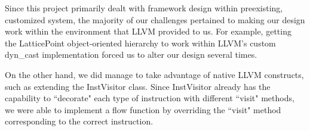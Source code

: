 \documentclass{article}
\theoremstyle{definition}
\begin{document}
Since this project primarily dealt with framework design within preexisting, customized system, the majority of our challenges pertained to making our design work within the environment that LLVM provided to us. For example, getting the LatticePoint object-oriented hierarchy to work within LLVM's custom dyn\_cast implementation forced us to alter our design several times.

On the other hand, we did manage to take advantage of native LLVM constructs, such as extending the InstVisitor class. Since InstVisitor already has the capability to ``decorate" each type of instruction with different ``visit" methods, we were able to implement a flow function by overriding the ``visit" method corresponding to the correct instruction. 
\end{document}
